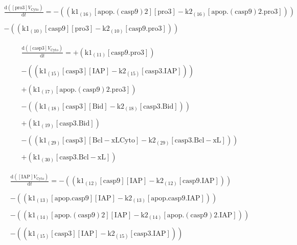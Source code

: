 \documentclass[a4paper,12pt]{article} %
\newcommand{\M}[1]{\mathrm{#1}}
\begin{document}
\begin{equation}
\begin{split}
\frac {\M{d}( {{\M{[pro3]}}    {V}_{\M{Cyto}} } ) }  {\M{d}{t} }  =  {  -  (( {{\M{k1}}_{\M{(16)}}    {\M{[apop.(casp9)2]}}    {\M{[pro3]}}  -  {\M{k2}}_{\M{(16)}}    {\M{[apop.(casp9)2.pro3]}} } )) } \\ 
  \\ 
   {  -  (( {{\M{k1}}_{\M{(10)}}    {\M{[casp9]}}    {\M{[pro3]}}  -  {\M{k2}}_{\M{(10)}}    {\M{[casp9.pro3]}} } )) } 
\end{split}
\end{equation}

\begin{equation}
\begin{split}
\frac {\M{d}( {{\M{[casp3]}}    {V}_{\M{Cyto}} } ) }  {\M{d}{t} }  =  {  +  ( {{\M{k1}}_{\M{(11)}}    {\M{[casp9.pro3]}} } ) } \\ 
  \\ 
   {  -  (( {{\M{k1}}_{\M{(15)}}    {\M{[casp3]}}    {\M{[IAP]}}  -  {\M{k2}}_{\M{(15)}}    {\M{[casp3.IAP]}} } )) } \\ 
  \\ 
   {  +  ( {{\M{k1}}_{\M{(17)}}    {\M{[apop.(casp9)2.pro3]}} } ) } \\ 
  \\ 
   {  -  (( {{\M{k1}}_{\M{(18)}}    {\M{[casp3]}}    {\M{[Bid]}}  -  {\M{k2}}_{\M{(18)}}    {\M{[casp3.Bid]}} } )) } \\ 
  \\ 
   {  +  ( {{\M{k1}}_{\M{(19)}}    {\M{[casp3.Bid]}} } ) } \\ 
  \\ 
   {  -  (( {{\M{k1}}_{\M{(29)}}    {\M{[casp3]}}    {\M{[Bcl-xL{Cyto}]}}  -  {\M{k2}}_{\M{(29)}}    {\M{[casp3.Bcl-xL]}} } )) } \\ 
  \\ 
   {  +  ( {{\M{k1}}_{\M{(30)}}    {\M{[casp3.Bcl-xL]}} } ) } 
\end{split}
\end{equation}


\begin{equation}
\begin{split}
\frac {\M{d}( {{\M{[IAP]}}    {V}_{\M{Cyto}} } ) }  {\M{d}{t} }  =  {  -  (( {{\M{k1}}_{\M{(12)}}    {\M{[casp9]}}    {\M{[IAP]}}  -  {\M{k2}}_{\M{(12)}}    {\M{[casp9.IAP]}} } )) } \\ 
  \\ 
   {  -  (( {{\M{k1}}_{\M{(13)}}    {\M{[apop.casp9]}}    {\M{[IAP]}}  -  {\M{k2}}_{\M{(13)}}    {\M{[apop.casp9.IAP]}} } )) } \\ 
  \\ 
   {  -  (( {{\M{k1}}_{\M{(14)}}    {\M{[apop.(casp9)2]}}    {\M{[IAP]}}  -  {\M{k2}}_{\M{(14)}}    {\M{[apop.(casp9)2.IAP]}} } )) } \\ 
  \\ 
   {  -  (( {{\M{k1}}_{\M{(15)}}    {\M{[casp3]}}    {\M{[IAP]}}  -  {\M{k2}}_{\M{(15)}}    {\M{[casp3.IAP]}} } )) }
\end{split}
\end{equation}
\end{document}
